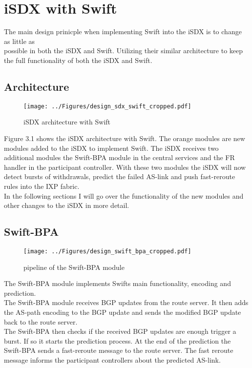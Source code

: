 \chapter{\label{chapter3}iSDX with Swift}

The main design prinicple when implementing Swift into the iSDX is to change as little as \\ 
possible in both the iSDX and Swift. Utilizing their similar architecture to keep the full functionality of both the iSDX and Swift.

\section{\label{chapter3:Architecture}Architecture}

\begin{figure}[h]
\center
\texttt{[image: ../Figures/design\_sdx\_swift\_cropped.pdf]}
\caption{iSDX architecture with Swift}
\end{figure}

Figure 3.1 shows the iSDX architecture with Swift. The orange modules are new modules added to the iSDX to implement Swift. The iSDX receives two additional modules the Swift-BPA module in the central services and the FR handler in the participant controller. With these two modules the iSDX will now detect bursts of withdrawals, predict the failed AS-link and push fast-reroute rules into the IXP fabric. \\
In the following sections I will go over the functionality of the new modules and other changes to the iSDX in more detail.

\section{\label{chapter3:Swift-BPA}Swift-BPA}

\begin{figure}[h]
\center
\texttt{[image: ../Figures/design\_swift\_bpa\_cropped.pdf]}
\caption{pipeline of the Swift-BPA module}
\end{figure}

The Swift-BPA module implements Swifts main functionality, encoding and prediction. \\
The Swift-BPA module receives BGP updates from the route server. It then adds the AS-path encoding to the BGP update and sends the modified BGP update back to the route server. \\
The Swift-BPA then checks if the received BGP updates are enough trigger a burst. If so it starts the prediction process. At the end of the prediction the Swift-BPA sends a fast-reroute message to the route server. The fast reroute message informs the participant controllers about the predicted AS-link. \\
 


